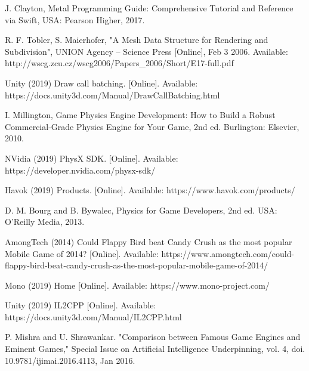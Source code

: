 \begin{thebibliography}{1}
J. Clayton, Metal Programming Guide: Comprehensive Tutorial and Reference via Swift, USA: Pearson Higher, 2017. 

R. F. Tobler, S. Maierhofer, "A Mesh Data Structure for Rendering and Subdivision", UNION Agency – Science Press [Online], Feb 3 2006. Available: http://wscg.zcu.cz/wscg2006/Papers\_2006/Short/E17-full.pdf 

Unity (2019) Draw call batching. [Online]. Available: https://docs.unity3d.com/Manual/DrawCallBatching.html

I. Millington, Game Physics Engine Development: How to Build a Robust Commercial-Grade Physics Engine for Your Game, 2nd ed. Burlington: Elsevier, 2010.

NVidia (2019) PhysX SDK. [Online]. Available: https://developer.nvidia.com/physx-sdk/

Havok (2019) Products. [Online]. Available: https://www.havok.com/products/

D. M. Bourg and B. Bywalec, Physics for Game Developers, 2nd ed. USA: O’Reilly Media, 2013.

AmongTech (2014) Could Flappy Bird beat Candy Crush as the most popular Mobile Game of 2014? [Online]. Available: https://www.amongtech.com/could-flappy-bird-beat-candy-crush-as-the-most-popular-mobile-game-of-2014/

Mono (2019) Home [Online]. Available: https://www.mono-project.com/

Unity (2019) IL2CPP [Online]. Available: https://docs.unity3d.com/Manual/IL2CPP.html

P. Mishra and U. Shrawankar. "Comparison between Famous Game Engines and Eminent Games," Special Issue on Artificial Intelligence Underpinning, vol. 4, doi. 10.9781/ijimai.2016.4113, Jan 2016.




\end{thebibliography}
